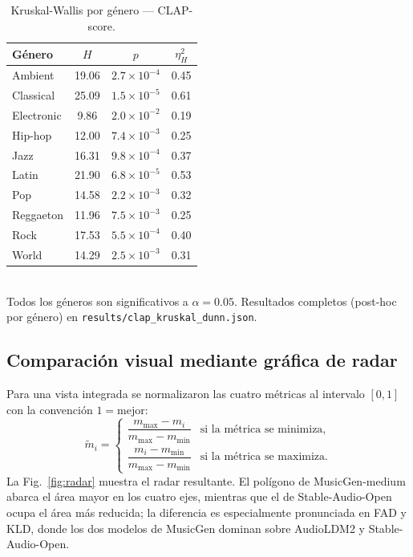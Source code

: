 \begin{table}[t]
  \caption{Kruskal-Wallis por género — CLAP-score.}
  \label{tab:kruskal_genre}
  \centering
  \begin{tabular}{lccc}
    \hline
    \textbf{Género} & \textbf{$H$} & \textbf{$p$} & \textbf{$\eta_H^2$} \\
    \hline
    Ambient     & 19.06 & $2.7\times10^{-4}$ & 0.45 \\
    Classical   & 25.09 & $1.5\times10^{-5}$ & 0.61 \\
    Electronic  &  9.86 & $2.0\times10^{-2}$ & 0.19 \\
    Hip-hop     & 12.00 & $7.4\times10^{-3}$ & 0.25 \\
    Jazz        & 16.31 & $9.8\times10^{-4}$ & 0.37 \\
    Latin       & 21.90 & $6.8\times10^{-5}$ & 0.53 \\
    Pop         & 14.58 & $2.2\times10^{-3}$ & 0.32 \\
    Reggaeton   & 11.96 & $7.5\times10^{-3}$ & 0.25 \\
    Rock        & 17.53 & $5.5\times10^{-4}$ & 0.40 \\
    World       & 14.29 & $2.5\times10^{-3}$ & 0.31 \\
    \hline
  \end{tabular}
  \smallskip\\
  \footnotesize{Todos los géneros son significativos a $\alpha=0.05$. Resultados
  completos (post-hoc por género) en \texttt{results/clap\_kruskal\_dunn.json}.}
\end{table}

\subsection{Comparación visual mediante gráfica de radar}
\label{sec:benchmark:radar}

Para una vista integrada se normalizaron las cuatro métricas al intervalo $[0,1]$
con la convención $1=\text{mejor}$:
\begin{equation}
  \tilde{m}_i =
  \begin{cases}
    \dfrac{m_{\max}-m_i}{m_{\max}-m_{\min}} & \text{si la métrica se minimiza,} \\[6pt]
    \dfrac{m_i-m_{\min}}{m_{\max}-m_{\min}} & \text{si la métrica se maximiza.}
  \end{cases}
  \label{eq:normalize}
\end{equation}
La Fig.~\ref{fig:radar} muestra el radar resultante. El polígono de
MusicGen-medium abarca el área mayor en los cuatro ejes, mientras que el de
Stable-Audio-Open ocupa el área más reducida; la diferencia es especialmente
pronunciada en FAD y KLD, donde los dos modelos de MusicGen dominan sobre
AudioLDM2 y Stable-Audio-Open.

